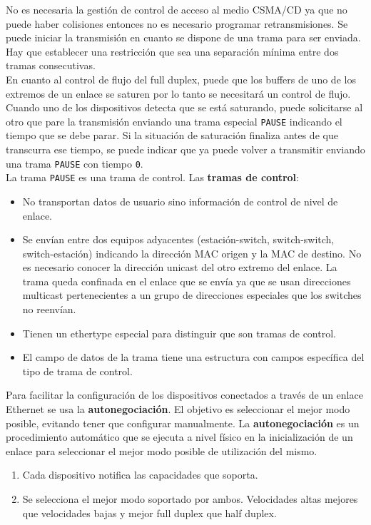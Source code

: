 \documentclass[10pt,portrait, twocolumn]{article}
\begin{document}
No es necesaria la gestión de control de acceso al medio CSMA/CD ya que no puede haber colisiones entonces no es necesario programar retransmisiones. Se puede iniciar la transmisión en cuanto se dispone de una trama para ser enviada. Hay que establecer una restricción  que sea una separación mínima entre dos tramas consecutivas.\\

En cuanto al control de flujo del full duplex, puede que los buffers de uno de los extremos de un enlace se saturen por lo tanto se necesitará un control de flujo. Cuando uno de los dispositivos detecta que se está saturando, puede solicitarse al otro que pare la transmisión enviando una trama especial \texttt{PAUSE} indicando el tiempo que se debe parar. Si la situación de saturación finaliza antes de que transcurra ese tiempo, se puede indicar que ya puede volver a transmitir enviando una trama \texttt{PAUSE} con tiempo \texttt{0}.\\

La trama \texttt{PAUSE} es una trama de control. Las \textbf{tramas de control}:

	\begin{itemize}
	\item No transportan datos de usuario sino información de control de nivel de enlace.
	\item Se envían entre dos equipos adyacentes (estación-switch, switch-switch, switch-estación) indicando la dirección MAC origen y la MAC de destino. No es necesario conocer la dirección unicast del otro extremo del enlace. La trama queda confinada en el enlace que se envía ya que se usan direcciones multicast pertenecientes a un grupo de direcciones especiales que los switches no reenvían.
	\item Tienen un ethertype especial para distinguir que son tramas de control.
	\item El campo de datos de la trama tiene una estructura con campos específica del tipo de trama de control.
	\end{itemize}
	
Para facilitar la configuración de los dispositivos conectados a través de un enlace Ethernet se usa la \textbf{autonegociación}. El objetivo es seleccionar el mejor modo posible, evitando tener que configurar manualmente. La \textbf{autonegociación} es un procedimiento automático que se ejecuta a nivel físico en la inicialización de un enlace para seleccionar el mejor modo posible de utilización del mismo.

	\begin{enumerate}
	\item Cada dispositivo notifica las capacidades que soporta.
	\item Se selecciona el mejor modo soportado por ambos. Velocidades altas mejores que velocidades bajas y mejor full duplex que half duplex.
	\end{enumerate}
	
\end{document}
